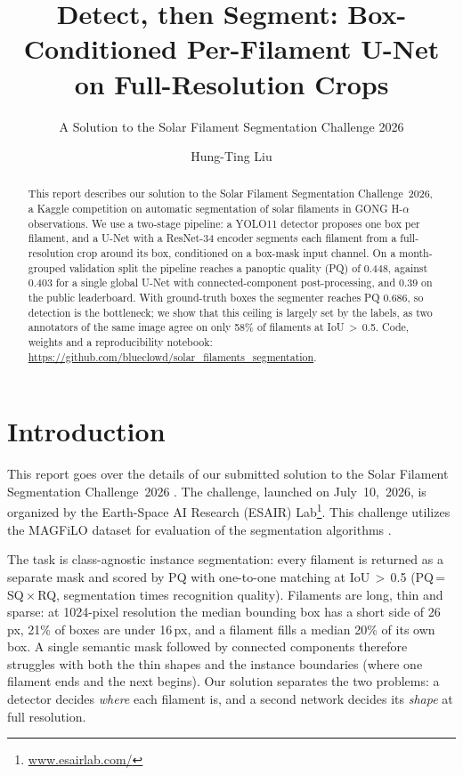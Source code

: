 \documentclass[sigconf]{acmart}
\begin{document}
\title{Detect, then Segment: Box-Conditioned Per-Filament U-Net on Full-Resolution Crops}  %
\subtitle{A Solution to the Solar Filament Segmentation Challenge 2026} %


\author{Hung-Ting Liu}

\begin{abstract}
    This report describes our solution to the Solar Filament Segmentation Challenge~2026, a Kaggle competition on automatic segmentation of solar filaments in GONG H-$\alpha$ observations. We use a two-stage pipeline: a YOLO11 detector proposes one box per filament, and a U-Net with a ResNet-34 encoder segments each filament from a full-resolution crop around its box, conditioned on a box-mask input channel. On a month-grouped validation split the pipeline reaches a panoptic quality (PQ) of 0.448, against 0.403 for a single global U-Net with connected-component post-processing, and 0.39 on the public leaderboard. With ground-truth boxes the segmenter reaches PQ 0.686, so detection is the bottleneck; we show that this ceiling is largely set by the labels, as two annotators of the same image agree on only 58\% of filaments at IoU\,$>$\,0.5. Code, weights and a reproducibility notebook: \url{https://github.com/blueclowd/solar_filaments_segmentation}.
\end{abstract}

\maketitle


\section{Introduction}
    This report goes over the details of our submitted solution to the Solar Filament Segmentation Challenge~2026 \cite{filament-segmentation-2026}. The challenge, launched on July~10,~2026, is organized by the Earth-Space AI Research (ESAIR) Lab\footnote{\href{https://www.esairlab.com/home}{www.esairlab.com/}}. This challenge utilizes the MAGFiLO dataset for evaluation of the segmentation algorithms \cite{ahmadzadeh2024dataset}.

    The task is class-agnostic instance segmentation: every filament is returned as a separate mask and scored by PQ \cite{kirillov2019panoptic} with one-to-one matching at IoU\,$>$\,0.5 (PQ\,=\,SQ\,$\times$\,RQ, segmentation times recognition quality). Filaments are long, thin and sparse: at 1024-pixel resolution the median bounding box has a short side of 26\,px, 21\% of boxes are under 16\,px, and a filament fills a median 20\% of its own box. A single semantic mask followed by connected components therefore struggles with both the thin shapes and the instance boundaries (where one filament ends and the next begins). Our solution separates the two problems: a detector decides \emph{where} each filament is, and a second network decides its \emph{shape} at full resolution.
\end{document}
